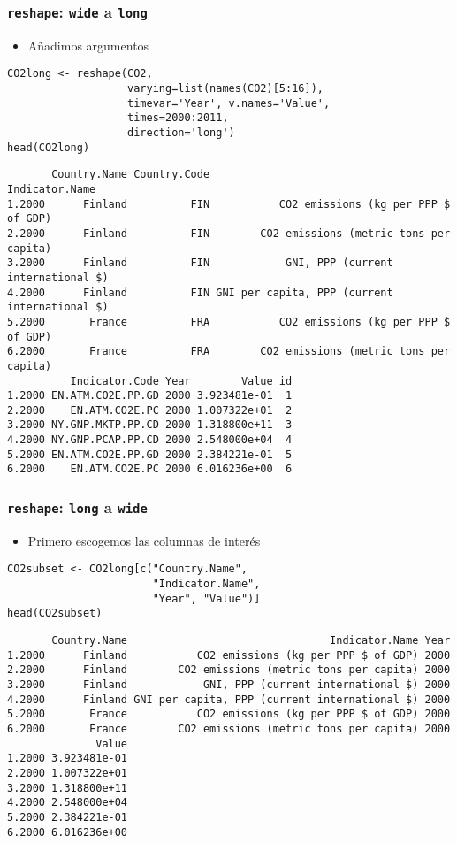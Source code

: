 \documentclass[xcolor={usenames,svgnames,dvipsnames}]{beamer}
\begin{document}
\begin{frame}[fragile]
\frametitle{\texttt{reshape}: \texttt{wide} a \texttt{long}}
\label{sec-4-4}

\begin{itemize}
\item Añadimos argumentos
\end{itemize}

\lstset{language=R}
\begin{lstlisting}
CO2long <- reshape(CO2,
                   varying=list(names(CO2)[5:16]),
                   timevar='Year', v.names='Value',
                   times=2000:2011,
                   direction='long')
head(CO2long)
\end{lstlisting}


\begin{verbatim}
       Country.Name Country.Code                                Indicator.Name
1.2000      Finland          FIN           CO2 emissions (kg per PPP $ of GDP)
2.2000      Finland          FIN        CO2 emissions (metric tons per capita)
3.2000      Finland          FIN            GNI, PPP (current international $)
4.2000      Finland          FIN GNI per capita, PPP (current international $)
5.2000       France          FRA           CO2 emissions (kg per PPP $ of GDP)
6.2000       France          FRA        CO2 emissions (metric tons per capita)
          Indicator.Code Year        Value id
1.2000 EN.ATM.CO2E.PP.GD 2000 3.923481e-01  1
2.2000    EN.ATM.CO2E.PC 2000 1.007322e+01  2
3.2000 NY.GNP.MKTP.PP.CD 2000 1.318800e+11  3
4.2000 NY.GNP.PCAP.PP.CD 2000 2.548000e+04  4
5.2000 EN.ATM.CO2E.PP.GD 2000 2.384221e-01  5
6.2000    EN.ATM.CO2E.PC 2000 6.016236e+00  6
\end{verbatim}
\end{frame}
\begin{frame}[fragile]
\frametitle{\texttt{reshape}: \texttt{long} a \texttt{wide}}
\label{sec-4-5}

\begin{itemize}
\item Primero escogemos las columnas de interés
\end{itemize}

\lstset{language=R}
\begin{lstlisting}
CO2subset <- CO2long[c("Country.Name",
                       "Indicator.Name",
                       "Year", "Value")]
head(CO2subset)
\end{lstlisting}


\begin{verbatim}
       Country.Name                                Indicator.Name Year
1.2000      Finland           CO2 emissions (kg per PPP $ of GDP) 2000
2.2000      Finland        CO2 emissions (metric tons per capita) 2000
3.2000      Finland            GNI, PPP (current international $) 2000
4.2000      Finland GNI per capita, PPP (current international $) 2000
5.2000       France           CO2 emissions (kg per PPP $ of GDP) 2000
6.2000       France        CO2 emissions (metric tons per capita) 2000
              Value
1.2000 3.923481e-01
2.2000 1.007322e+01
3.2000 1.318800e+11
4.2000 2.548000e+04
5.2000 2.384221e-01
6.2000 6.016236e+00
\end{verbatim}
\end{frame}
\end{document}
